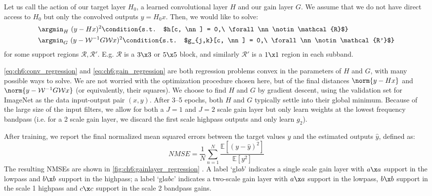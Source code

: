 Let us call the action of our target layer $H_0$, a learned convolutional layer $H$
and our gain layer $G$.
We assume that we do not have direct
access to $H_0$ but only the convolved outputs $y=H_0 x$. Then, we would like to solve:
\begin{align}
  & \argmin_{H}\ (y - Hx)^2 %
  \condition{s.t. $h[c, \nn] = 0,\ \forall \nn \notin \mathcal{R}$} \label{eq:ch6:conv_regression}\\
  & \argmin_{G}\ (y - \mathcal{W}^{-1}G\mathcal{W}x)^2 %
  \condition{s.t. $g_{j,k}[c, \nn] = 0,\ \forall \nn \notin \mathcal{R'}$} \label{eq:ch6:gain_regression}
\end{align}
for some support regions $\mathcal{R},\mathcal{R'}$. E.g. $\mathcal{R}$ is a $3\x3$ or $5\x5$
block, and similarly $\mathcal{R'}$ is a $1\x 1$ region in each
subband.

\eqref{eq:ch6:conv_regression} and \eqref{eq:ch6:gain_regression} are both
regression problems convex in the parameters of $H$ and $G$, with many possible
ways to solve. We are not worried with the optimization procedure chosen here,
but of the final distances $\norm{y-Hx}$ and $\norm{y-\mathcal{W}^{-1}G\mathcal{W}x}$ (or
equivalently, their squares). We choose to find $H$ and $G$ by gradient descent,
using the validation set for ImageNet as the data input-output pair $(x, y)$.
After 3--5 epochs, both $H$ and $G$ typically settle into their global minimum.
Because of the large size of the input filters, we allow for both a $J=1$ and
$J=2$ scale gain layer but only learn weights at the lowest frequency bandpass
(i.e. for a 2 scale gain layer, we discard the first scale highpass outputs and
only learn $g_2$).

After training, we report the final normalized mean squared errors between the
target values $y$ and the estimated outputs $\hat{y}$, defined as:
\begin{equation}
  NMSE = \frac{1}{N} \sum_{n=1}^N \frac{\mathbb{E}\left[(y-\hat{y})^2\right]}{\mathbb{E}\left[y^2\right]}
\end{equation}
The resulting NMSEs are shown in \autoref{fig:ch6:gainlayer_regression} . A label
`gl$ab$' indicates a single scale gain layer with $a\x a$ support in the lowpass
and $b\x b$ support in the highpass; a label `gl$abc$' indicates a two-scale
gain layer with $a\x a$ support in the lowpass, $b\x b$ support in the scale 1
highpass and $c\x c$ support in the scale 2 bandpass gains.

